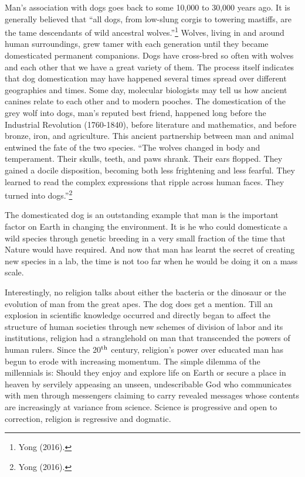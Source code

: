 \begin{multicols}{2}
Man's association with dogs goes back to some 10,000 to 30,000 years ago. It is generally believed that “all dogs, from low-slung corgis to towering mastiffs, are the tame descendants of wild ancestral wolves.”\footnote{Yong (2016).} Wolves, living in and around human surroundings, grew tamer with each generation until they became domesticated permanent companions. Dogs have cross-bred so often with wolves and each other that we have a great variety of them. The process itself indicates that dog domestication may have happened several times spread over different geographies and times. Some day, molecular biologists may tell us how ancient canines relate to each other and to modern pooches. The domestication of the grey wolf into dogs, man's reputed best friend, happened long before the Industrial Revolution (1760-1840), before literature and mathematics, and before bronze, iron, and agriculture. This ancient partnership between man and animal entwined the fate of the two species. “The wolves changed in body and temperament. Their skulls, teeth, and paws shrank. Their ears flopped. They gained a docile disposition, becoming both less frightening and less fearful. They learned to read the complex expressions that ripple across human faces. They turned into dogs.”\footnote{Yong (2016).}

The domesticated dog is an outstanding example that man is the important factor on Earth in changing the environment. It is he who could domesticate a wild species through genetic breeding in a very small fraction of the time that Nature would have required. And now that man has learnt the secret of creating new species in a lab, the time is not too far when he would be doing it on a mass scale.

Interestingly, no religion talks about either the bacteria or the dinosaur or the evolution of man from the great apes. The dog does get a mention. Till an explosion in scientific knowledge occurred and directly began to affect the structure of human societies through new schemes of division of labor and its institutions, religion had a stranglehold on man that transcended the powers of human rulers. Since the 20$^{\rm{ th}}$ century, religion's power over educated man has begun to erode with increasing momentum. The simple dilemma of the millennials is: Should they enjoy and explore life on Earth or secure a place in heaven by servilely appeasing an unseen, undescribable God who communicates with men through messengers claiming to carry revealed messages whose contents are increasingly at variance from science. Science is progressive and open to correction, religion is regressive and dogmatic.


\end{multicols}
